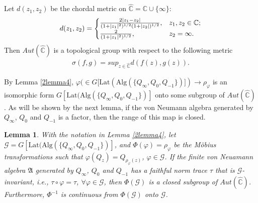 \documentclass{amsart}
\newcommand{\AAA}{\mathfrak A}
\newcommand{\Lat}{\mathrm{Lat}}
\newcommand{\Alg}{\mathrm{Alg}}
\newcommand{\C}{\mathbb C} %
\newtheorem{lemma}{Lemma}[section]
\begin{document}
Let $d(z_1, z_2)$ be the chordal metric on $\widehat{\C} = \C \cup \{\infty \}$:
\begin{eqnarray}
d(z_1, z_2)=
\begin{cases}
\frac{ 2| z_1 - z_2|}{(1 + |z_1|^2)^{1/2} (1 + |z_2|)^{1/2}}, & z_1 , z_2  \in \C ; \cr 
\frac{2}{(1 + |z_1|^{2})^{1/2}} , & z_2 = \infty. 
\end{cases}
\end{eqnarray}
Then $Aut(\widehat{\C})$ is a topological group with respect to the following metric
\begin{align*}
\sigma(f,g) = sup_{z \in \widehat{\C}}d(f(z), g(z)).
\end{align*}

By Lemma \ref{2lemma4}, $\varphi (\in  G[\Lat(\Alg( \{ Q_{\infty},  Q_{0}, Q_{-1} \})]) \rightarrow \rho_{\varphi} $ is an isomorphic 
form $G[\Lat(\Alg( \{ Q_{\infty},  Q_{0}, Q_{-1} \})]$ onto some subgroup of $Aut(\widehat{\C})$ . As will be shown by the next lemma, if
the von Neumann algebra generated by $ Q_{\infty}$, $Q_{0}$ and $Q_{-1}$ is a factor, then the range 
of this map is closed. 

\begin{lemma}\label{2lemma6}
With the notation in Lemma \ref{2lemma4}, let $\mathcal{G} =G[\Lat(\Alg( \{ Q_{\infty},  Q_{0}, Q_{-1} \})]$, and $\Phi(\varphi) = \rho_{\varphi}$ be the M\"{o}bius transformations such that 
$\varphi(Q_{z}) = Q_{\rho_{\varphi}(z)}$,  $\varphi \in \mathcal{G}$. If the finite von Neuamann algebra $\AAA$ generated by $ Q_{\infty}$, $Q_{0}$ and $Q_{-1}$ has a faithful norm trace $\tau$ that is 
$\mathcal{G}$-invariant, i.e., $\tau \circ \varphi = \tau$, $\forall \varphi \in \mathcal{G}$,
then $ \Phi(\mathcal{G})$ is a closed subgroup of $Aut(\widehat{\C})$. Furthermore, $\Phi^{-1}$ is continuous from $\Phi(\mathcal{G})$ onto $\mathcal{G}$.
\end{lemma}
\end{document}
